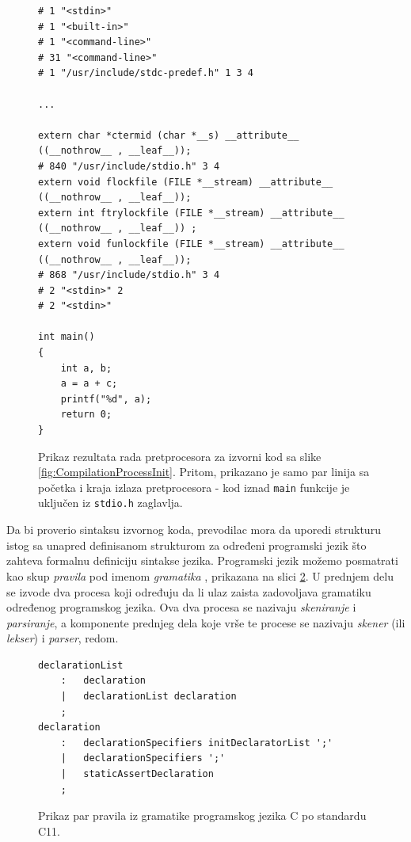 \begin{figure}[h!]
\begin{lstlisting}
# 1 "<stdin>"
# 1 "<built-in>"
# 1 "<command-line>"
# 31 "<command-line>"
# 1 "/usr/include/stdc-predef.h" 1 3 4

...

extern char *ctermid (char *__s) __attribute__ ((__nothrow__ , __leaf__));
# 840 "/usr/include/stdio.h" 3 4
extern void flockfile (FILE *__stream) __attribute__ ((__nothrow__ , __leaf__));
extern int ftrylockfile (FILE *__stream) __attribute__ ((__nothrow__ , __leaf__)) ;
extern void funlockfile (FILE *__stream) __attribute__ ((__nothrow__ , __leaf__));
# 868 "/usr/include/stdio.h" 3 4
# 2 "<stdin>" 2
# 2 "<stdin>"

int main()
{
    int a, b;
    a = a + c;
    printf("%d", a);
    return 0;
}
\end{lstlisting}
\caption{Prikaz rezultata rada pretprocesora za izvorni kod sa slike \ref{fig:CompilationProcessInit}. Pritom, prikazano je samo par linija sa početka i kraja izlaza pretprocesora - kod iznad \texttt{main} funkcije je uključen iz \texttt{stdio.h} zaglavlja.}
\label{fig:CompilationProcessPrep}
\end{figure}

Da bi proverio sintaksu izvornog koda, prevodilac mora da uporedi strukturu istog sa unapred definisanom strukturom za određeni programski jezik što zahteva formalnu definiciju sintakse jezika. Programski jezik možemo posmatrati kao skup \emph{pravila} pod imenom \emph{gramatika} \cite{ContextFreeGrammars}, prikazana na slici \ref{fig:CompilationProcessGram}. U prednjem delu se izvode dva procesa koji određuju da li ulaz zaista zadovoljava gramatiku određenog programskog jezika. Ova dva procesa se nazivaju \emph{skeniranje} i \emph{parsiranje}, a komponente prednjeg dela koje vrše te procese se nazivaju \emph{skener} (ili \emph{lekser}) i \emph{parser}, redom.

\begin{figure}[h!]
\begin{lstlisting}[language={}]
declarationList
    :   declaration
    |   declarationList declaration
    ;
declaration
    :   declarationSpecifiers initDeclaratorList ';'
    | 	declarationSpecifiers ';'
    |   staticAssertDeclaration
    ;
\end{lstlisting}
\caption{Prikaz par pravila iz gramatike programskog jezika C po standardu C11.}
\label{fig:CompilationProcessGram}
\end{figure}

